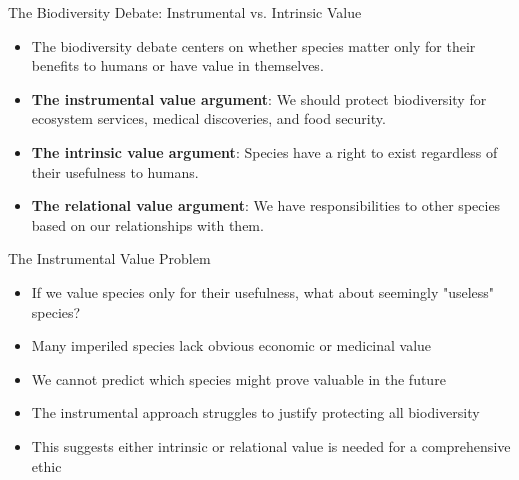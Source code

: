 \documentclass{beamer}
\begin{document}
	\begin{frame}{The Biodiversity Debate: Instrumental vs. Intrinsic Value}
		\begin{itemize}
			\item The biodiversity debate centers on whether species matter only for their benefits to humans or have value in themselves.
			\item \textbf{The instrumental value argument}: We should protect biodiversity for ecosystem services, medical discoveries, and food security.
			\item \textbf{The intrinsic value argument}: Species have a right to exist regardless of their usefulness to humans.
			\item \textbf{The relational value argument}: We have responsibilities to other species based on our relationships with them.
		\end{itemize}
		
		\begin{alertblock}{The Instrumental Value Problem}
			\scriptsize
			\begin{itemize}
				\item If we value species only for their usefulness, what about seemingly "useless" species?
				\item Many imperiled species lack obvious economic or medicinal value
				\item We cannot predict which species might prove valuable in the future
				\item The instrumental approach struggles to justify protecting all biodiversity
				\item This suggests either intrinsic or relational value is needed for a comprehensive ethic
			\end{itemize}
		\end{alertblock}
	\end{frame}
	
\end{document}
